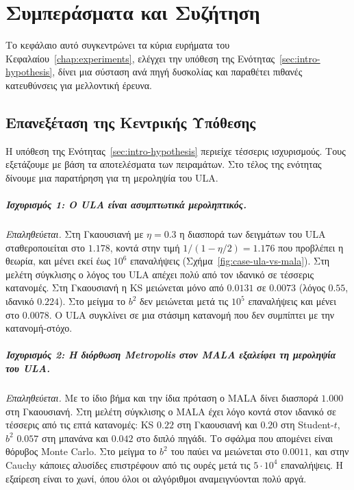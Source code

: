 \chapter{Συμπεράσματα και Συζήτηση}
\label{chap:conclusions}

Το κεφάλαιο αυτό συγκεντρώνει τα κύρια ευρήματα του
Κεφαλαίου~\ref{chap:experiments}, ελέγχει την υπόθεση της
Ενότητας~\ref{sec:intro-hypothesis}, δίνει μια σύσταση ανά πηγή δυσκολίας και
παραθέτει πιθανές κατευθύνσεις για μελλοντική έρευνα.

\section{Επανεξέταση της Κεντρικής Υπόθεσης}
\label{sec:concl-hypothesis}

Η υπόθεση της Ενότητας~\ref{sec:intro-hypothesis} περιείχε τέσσερις ισχυρισμούς. Τους
εξετάζουμε με βάση τα αποτελέσματα των πειραμάτων. Στο τέλος της ενότητας δίνουμε μια
παρατήρηση για τη μεροληψία του ULA.

\paragraph{Ισχυρισμός 1: Ο ULA είναι ασυμπτωτικά μεροληπτικός.}
\emph{Επαληθεύεται.} Στη Γκαουσιανή με $\eta = 0.3$ η διασπορά των δειγμάτων του ULA
σταθεροποιείται στο $1.178$, κοντά στην τιμή $1/(1-\eta/2)=1.176$ που προβλέπει η θεωρία, και
μένει εκεί έως $10^6$ επαναλήψεις (Σχήμα~\ref{fig:case-ula-vs-mala}). Στη μελέτη
σύγκλισης ο λόγος του ULA απέχει πολύ από τον ιδανικό σε τέσσερις κατανομές. Στη
Γκαουσιανή η KS μειώνεται μόνο από $0.0131$ σε $0.0073$ (λόγος $0.55$, ιδανικό $0.224$).
Στο μείγμα το $b^2$ δεν μειώνεται μετά τις $10^5$ επαναλήψεις και μένει στο $0.0078$. Ο ULA συγκλίνει σε μια
στάσιμη κατανομή που δεν συμπίπτει με την κατανομή-στόχο.

\paragraph{Ισχυρισμός 2: Η διόρθωση Metropolis στον MALA εξαλείφει τη μεροληψία
του ULA.}
\emph{Επαληθεύεται.} Με το ίδιο βήμα και την ίδια πρόταση ο MALA δίνει διασπορά
$1.000$ στη Γκαουσιανή. Στη μελέτη σύγκλισης ο MALA έχει λόγο κοντά στον ιδανικό σε
τέσσερις από τις επτά κατανομές: KS $0.22$ στη Γκαουσιανή και $0.20$ στη Student-$t$,
$b^2$ $0.057$ στη μπανάνα και $0.042$ στο διπλό πηγάδι. Το σφάλμα που απομένει είναι
θόρυβος Monte Carlo. Στο μείγμα το $b^2$ του παύει να μειώνεται στο $0.0011$, και στην Cauchy
κάποιες αλυσίδες επιστρέφουν από τις ουρές μετά τις $5 \cdot 10^4$ επαναλήψεις. Η εξαίρεση είναι το χωνί, όπου όλοι οι
αλγόριθμοι αναμειγνύονται πολύ αργά.

